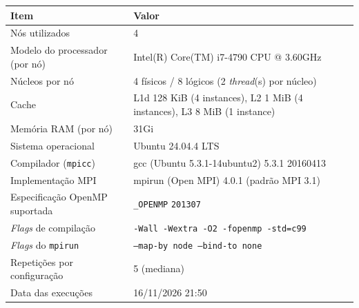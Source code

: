 \begin{tabular}{@{}lp{}@{}}
\toprule
Item & Valor \\
\midrule
Nós utilizados & 4 \\
Modelo do processador (por nó) & Intel(R) Core(TM) i7-4790 CPU @ 3.60GHz \\
Núcleos por nó & 4 físicos / 8 lógicos (2 \emph{thread}(s) por núcleo) \\
Cache & L1d 128 KiB (4 instances), L2 1 MiB (4 instances), L3 8 MiB (1 instance) \\
Memória RAM (por nó) & 31Gi \\
Sistema operacional & Ubuntu 24.04.4 LTS \\
Compilador (\texttt{mpicc}) & gcc (Ubuntu 5.3.1-14ubuntu2) 5.3.1 20160413 \\
Implementação MPI & mpirun (Open MPI) 4.0.1 (padrão MPI 3.1) \\
Especificação OpenMP suportada & \texttt{\_OPENMP} \texttt{201307} \\
\emph{Flags} de compilação & \texttt{-Wall -Wextra -O2 -fopenmp -std=c99} \\
\emph{Flags} do \texttt{mpirun} & \texttt{--map-by node --bind-to none} \\
Repetições por configuração & 5 (mediana) \\
Data das execuções & 16/11/2026 21:50 \\
\bottomrule
\end{tabular}
